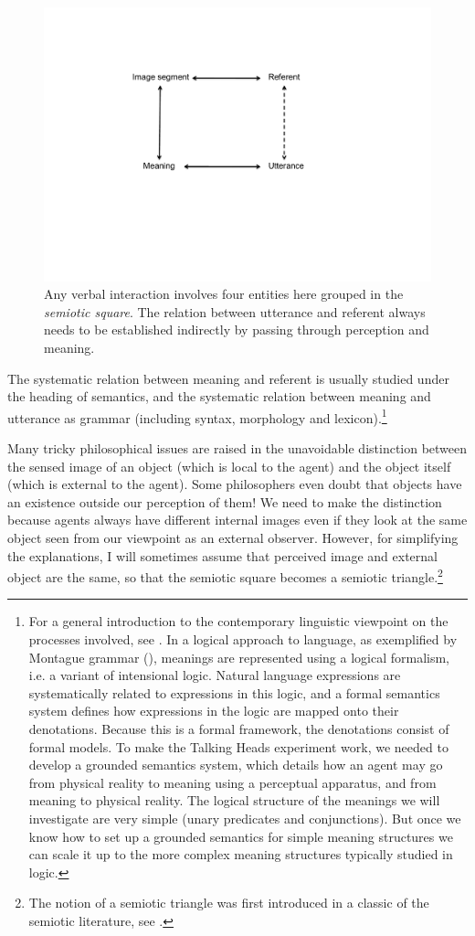 \begin{figure}[htbp]
  \centerline{\includegraphics[width=.65\textwidth]{chap2/figs/triangle.pdf}}
\caption{\label{triangle}Any verbal interaction
involves four entities here grouped in the
{\itshape semiotic square}. The relation between utterance
and referent always needs to be established indirectly by 
passing through perception and meaning.}
\end{figure}

The systematic relation between meaning and referent is 
usually studied under the heading of semantics, and the 
systematic relation between meaning and utterance as
grammar (including syntax, morphology and lexicon).\footnote{For a general introduction to the contemporary linguistic
viewpoint on the processes involved, see  \cite{Vanvalin:1997}. 
In a logical approach to language, as 
exemplified by Montague grammar (\citealt{Montague:1974}),  
meanings are represented using a logical formalism, i.e.
a variant of intensional logic. 
Natural language expressions are systematically 
related to expressions in this logic, and a
formal semantics system defines how expressions in the logic
are mapped onto their denotations. Because this is 
a formal framework, the denotations consist of formal 
models. To make the Talking Heads experiment work, 
we needed to develop a grounded semantics system, which details
how an agent may go from physical reality to meaning
using a perceptual apparatus, and from meaning 
to physical reality. The logical structure of 
the meanings we will investigate are very simple 
(unary predicates and conjunctions). But once we know how to 
set up a grounded semantics for simple meaning
structures we can scale it up to the more complex meaning
structures typically studied in logic.}

Many tricky philosophical issues are raised in 
the unavoidable distinction between the sensed image
of an object (which is local to the agent)
and the object itself (which is external to the 
agent). Some philosophers even doubt that objects 
have an existence outside our perception of them! 
We need to make the distinction because agents always
have different internal images even if they look at 
the same object seen from our viewpoint as an external
observer. However, for simplifying the 
explanations, I will sometimes assume that perceived
image and external object are the same, so that the 
semiotic square becomes a semiotic triangle.\footnote{The notion of a semiotic triangle was first
introduced in a classic of the semiotic literature, 
see \cite{Ogden:1935}.}


